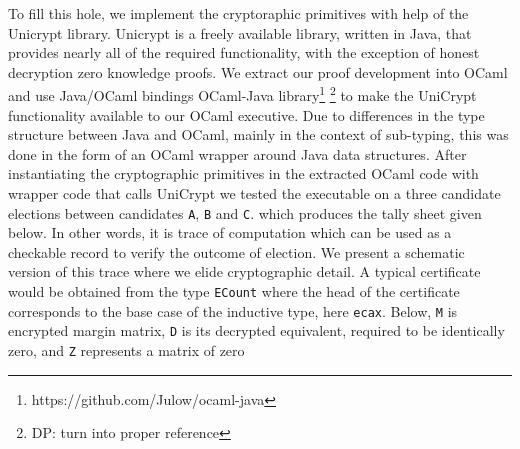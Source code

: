 \documentclass{llncs}
\begin{document}
To fill this hole, we implement the cryptoraphic primitives with
help of the Unicrypt library\cite{LocherH14}.
Unicrypt is a freely available library, written in Java,  that provides nearly all of
the required functionality, with the exception of honest decryption
zero knowledge proofs.  We extract our proof development into OCaml
and use Java/OCaml bindings 
OCaml-Java library\footnote{ 
https://github.com/Julow/ocaml-java} 
\footnote{DP: turn into proper reference} to make the UniCrypt
functionality available to our OCaml executive. Due to differences
in the type structure between Java and OCaml, mainly in the context
of sub-typing, this was done in the form of an OCaml wrapper around
Java data structures. 
% 
 After instantiating the  
 cryptographic primitives in the extracted OCaml code with wrapper
 code that calls UniCrypt
 we tested the executable on a three candidate elections between
 candidates \texttt{A}, \texttt{B} and \texttt{C}.
 which produces the tally sheet given below. In other words, 
 it is trace of computation which can be used as a checkable record to verify
 the outcome of election.  We present a schematic version of this
 trace where we elide cryptographic detail. A typical certificate
 would be obtained from the type \texttt{ECount} where the head
 of the certificate corresponds to the base case of the inductive
 type, here \texttt{ecax}. Below, \texttt{M} is encrypted margin
 matrix, \texttt{D} is its decrypted equivalent, required to be
 identically zero, and \texttt{Z} represents a matrix of zero
\end{document}
